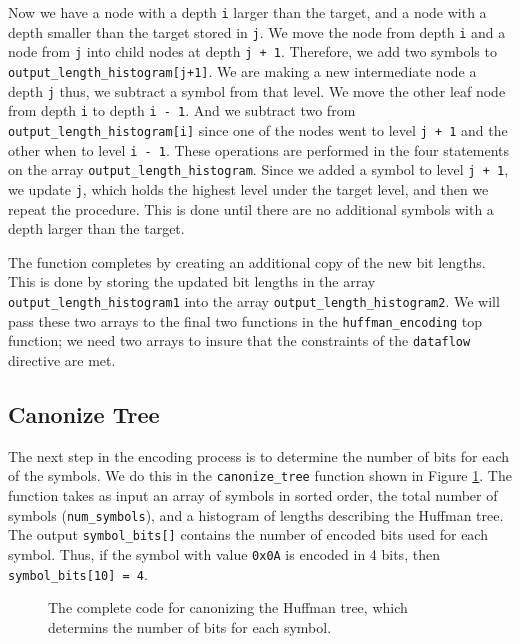 Now we have a node with a depth \lstinline{i} larger than the target, and a node with a depth smaller than the target stored in \lstinline{j}. We move the node from depth \lstinline{i} and a node from \lstinline{j} into child nodes at depth \lstinline{j + 1}. Therefore, we add two symbols to \lstinline{output_length_histogram[j+1]}. We are making a new intermediate node a depth \lstinline{j} thus, we subtract a symbol from that level. We move the other leaf node from depth \lstinline{i} to depth \lstinline{i - 1}. And we subtract two from \lstinline{output_length_histogram[i]} since one of the nodes went to level \lstinline{j + 1} and the other when to level \lstinline{i - 1}. These operations are performed in the four statements on the array \lstinline{output_length_histogram}. Since we added a symbol to level \lstinline{j + 1}, we update \lstinline{j}, which holds the highest level under the target level, and then we repeat the procedure. This is done until there are no additional symbols with a depth larger than the target.

The function completes by creating an additional copy of the new bit lengths. This is done by storing the updated bit lengths in the array \lstinline{output_length_histogram1} into the array \lstinline{output_length_histogram2}. We will pass these two arrays to the final two functions in the \lstinline{huffman_encoding} top function; we need two arrays to insure that the constraints of the \lstinline{dataflow} directive are met.

\subsection{Canonize Tree}
\label{sec:huffman_canonize_tree}

The next step in the encoding process is to determine the number of bits for each of the symbols. We do this in the \lstinline{canonize_tree} function shown in Figure \ref{fig:huffman_canonize_tree.cpp}. The function takes as input an array of symbols in sorted order, the total number of symbols (\lstinline{num_symbols}), and a histogram of lengths describing the Huffman tree. The output \lstinline{symbol_bits[]} contains the number of encoded bits used for each symbol. Thus, if the symbol with value \lstinline{0x0A} is encoded in 4 bits, then \lstinline{symbol_bits[10] = 4}. 

\begin{figure}

\caption{ The complete code for canonizing the Huffman tree, which determins the number of bits for each symbol. }
\label{fig:huffman_canonize_tree.cpp}
\end{figure}

